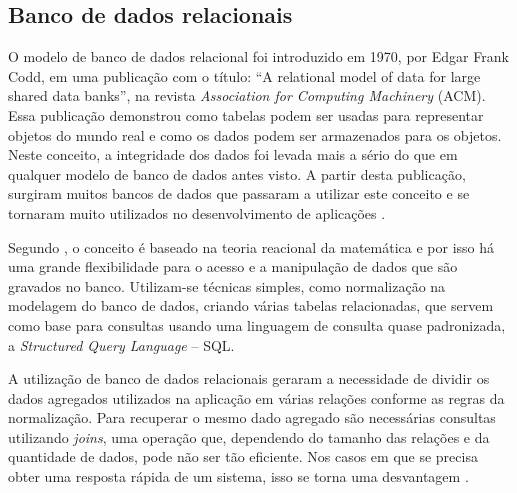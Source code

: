 \subsection{Banco de dados relacionais}

\par O modelo de banco de dados relacional foi introduzido em 1970, por Edgar Frank Codd, em uma publicação com o título: “A relational model of data for large shared data banks”, na revista \textit{Association for Computing Machinery} (ACM). Essa publicação demonstrou como tabelas podem ser usadas para representar objetos do mundo real e como os dados podem ser armazenados para os objetos. Neste conceito, a integridade dos dados foi levada mais a sério do que em qualquer modelo de banco de dados antes visto. A partir desta publicação, surgiram muitos bancos de dados que passaram a utilizar este conceito e se tornaram muito utilizados no desenvolvimento de aplicações
\cite{matthew_stones_beginning_databases_with_postgresql}.

\par Segundo , o conceito é baseado na teoria reacional da matemática e por isso há uma grande flexibilidade para o acesso e a manipulação de dados que são gravados no banco. Utilizam-se técnicas simples, como normalização na modelagem do banco de dados, criando várias tabelas relacionadas, que servem como base para consultas usando uma linguagem de consulta quase padronizada, a \textit{Structured Query Language} – SQL\footnotemark[5].



\par A utilização de banco de dados relacionais geraram a necessidade de dividir os dados agregados utilizados na aplicação em várias relações conforme as regras da normalização. Para recuperar o mesmo dado agregado são necessárias consultas utilizando \textit{joins}\footnotemark[6], uma operação que, dependendo do tamanho das relações e da quantidade de dados, pode não ser tão eficiente. Nos casos em que se precisa obter uma resposta rápida de um sistema, isso se torna uma desvantagem \cite{sadalage_fowler_nosql_distilled_brief_guide}.

